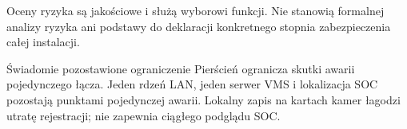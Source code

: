 Oceny ryzyka są jakościowe i służą wyborowi funkcji. Nie stanowią formalnej analizy ryzyka ani podstawy do deklaracji konkretnego stopnia zabezpieczenia całej instalacji.
\begin{note}{Świadomie pozostawione ograniczenie}
Pierścień ogranicza skutki awarii pojedynczego łącza. Jeden rdzeń LAN, jeden serwer VMS i lokalizacja SOC pozostają punktami pojedynczej awarii. Lokalny zapis na kartach kamer łagodzi utratę rejestracji; nie zapewnia ciągłego podglądu SOC.
\end{note}
